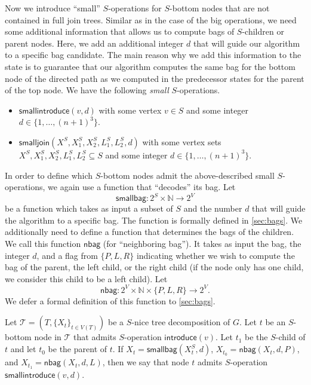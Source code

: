 \documentclass[a4paper,UKenglish,cleveref, autoref, thm-restate, numberwithinsect]{lipics-v2021}
\newcounter{algorithm}
\newcommand{\introduce}{\mathsf{introduce}}
\newcommand{\smallintroduce}{\mathsf{smallintroduce}}
\newcommand{\smalljoin}{\mathsf{smalljoin}}
\newcommand{\nbag}{\mathsf{nbag}}
\newcommand{\smallbag}{\mathsf{smallbag}}
\newcommand{\slim}{\text{slim}\xspace}
\begin{document}
Now we introduce ``small'' $S$-operations for $S$-bottom nodes that are not contained in full join trees.
Similar as in the case of the big operations, we need some additional information that allows us to compute bags of $S$-children or parent nodes. 
Here, we add an additional integer $d$ that will guide our algorithm to a specific bag candidate. The main reason why we add this information to the state is to guarantee that our algorithm computes the same bag for the bottom node of the directed path as we computed in the predecessor states for the parent of the top node.
We have the following \emph{small} $S$-operations.
\begin{itemize}
    \item $\smallintroduce(v, d)$ with some vertex $v\in S$ and some integer $d\in\{1,\ldots, (n+1)^3\}$.
    \item $\smalljoin(X^S,X_1^S,X_2^S,L_{1}^S, L_{2}^S,d)$ with some vertex sets $X^S,X_1^S,X_2^S,L_1^S,L_2^S\subseteq S$ and some integer $d\in\{1,\ldots,(n+1)^3\}$.
\end{itemize}
In order to define which $S$-bottom nodes admit the above-described small $S$-operations, we again use a function that ``decodes'' its bag. Let
\[
\smallbag : 2^S\times \mathbb{N}\rightarrow 2^V
\]
be a function which takes as input a subset of $S$ and the number $d$ that will guide the algorithm to a specific bag. The function is formally defined in \cref{sec:bags}.
We additionally need to define a function that determines the bags of the children. We call this function $\nbag$ (for ``neighboring bag''). It takes as input the bag, the integer $d$, and a flag from $\{P,L,R\}$ indicating whether we wish to compute the bag of the parent, the left child, or the right child (if the node only has one child, we consider this child to be a left child). Let
\[
\nbag : 2^V\times \mathbb{N}\times \{P,L,R\}\rightarrow 2^V.
\]
We defer a formal definition of this function to \cref{sec:bags}.


\begin{definition}[$\smallintroduce$]\label{def:smallintro}
    Let $\mathcal{T}=(T,\{X_t\}_{t\in V(T)})$ be a \slim $S$-nice tree decomposition of $G$. Let $t$ be an $S$-bottom node in $\mathcal{T}$ that admits $S$-operation $\introduce(v)$. Let $t_1$ be the $S$-child of $t$ and let $t_0$ be the parent of $t$. If $X_t=\smallbag(X^S_t,d)$, $X_{t_0}=\nbag(X_t,d,P)$, and $X_{t_1}=\nbag(X_t,d,L)$, then we say that node $t$ admits $S$-operation $\smallintroduce(v,d)$.
\end{definition}
\end{document}
